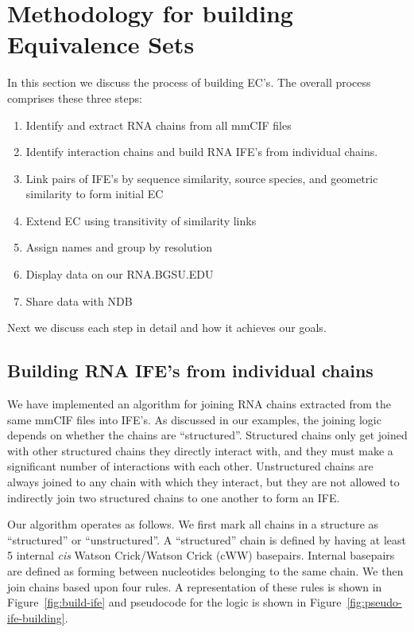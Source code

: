 \section{Methodology for building Equivalence Sets}

In this section we discuss the process of building EC's. The overall process
comprises these three steps:

\begin{enumerate}
  \item Identify and extract RNA chains from all mmCIF files

  \item Identify interaction chains and build RNA IFE's from individual chains.

  \item Link pairs of IFE's by sequence similarity, source species, and
    geometric similarity to form initial EC

  \item Extend EC using transitivity of similarity links

  \item Assign names and group by resolution

  \item Display data on our RNA\@.BGSU.EDU

  \item Share data with NDB
\end{enumerate}

Next we discuss each step in detail and how it achieves our goals.

\subsection{Building RNA IFE's from individual chains}

We have implemented an algorithm for joining RNA chains extracted from the same
mmCIF files into IFE's. As discussed in our examples, the joining logic depends
on whether the chains are ``structured''. Structured chains only get joined with
other structured chains they directly interact with, and they must make a
significant number of interactions with each other. Unstructured chains are
always joined to any chain with which they interact, but they are not allowed to
indirectly join two structured chains to one another to form an IFE.

Our algorithm operates as follows. We first mark all chains in a structure as
``structured'' or ``unstructured''. A ``structured'' chain is defined by having
at least 5 internal \emph{cis} Watson Crick/Watson Crick (cWW) basepairs.
Internal basepairs are defined as forming between nucleotides belonging to the
same chain. We then join chains based upon four rules. A representation of
these rules is shown in Figure~\ref{fig:build-ife} and pseudocode for the logic
is shown in Figure~\ref{fig:pseudo-ife-building}.

